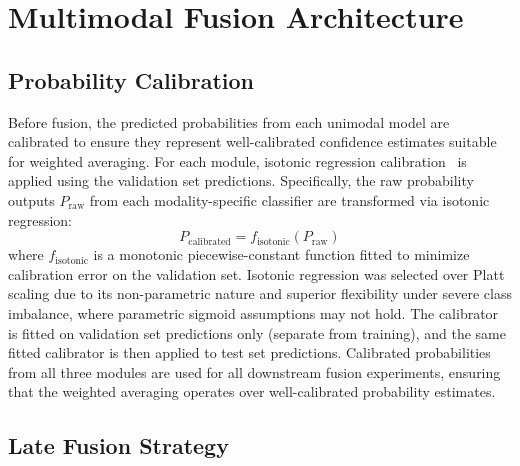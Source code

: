 \documentclass[10pt,letterpaper]{article}
\begin{document}
                                                                                                                  \section*{Multimodal Fusion Architecture}
                                                                                                                  \subsection*{Probability Calibration}

                                                                                                                  Before fusion, the predicted probabilities from each unimodal model are calibrated to ensure they represent well-calibrated confidence estimates suitable for weighted averaging. For each module, isotonic regression calibration~\cite{ref48} is applied using the validation set predictions. Specifically, the raw probability outputs $P_{\text{raw}}$ from each modality-specific classifier are transformed via isotonic regression:
                                                                                                                  \begin{equation} \label{eq_rob:28}
                                                                                                                  P_{\text{calibrated}} = f_{\text{isotonic}}(P_{\text{raw}})
                                                                                                                  \end{equation}
                                                                                                                  where $f_{\text{isotonic}}$ is a monotonic piecewise-constant function fitted to minimize calibration error on the validation set. Isotonic regression was selected over Platt scaling due to its non-parametric nature and superior flexibility under severe class imbalance, where parametric sigmoid assumptions may not hold. The calibrator is fitted on validation set predictions only (separate from training), and the same fitted calibrator is then applied to test set predictions. Calibrated probabilities from all three modules are used for all downstream fusion experiments, ensuring that the weighted averaging operates over well-calibrated probability estimates.

                                                                                                                  \subsection*{Late Fusion Strategy}
\end{document}
